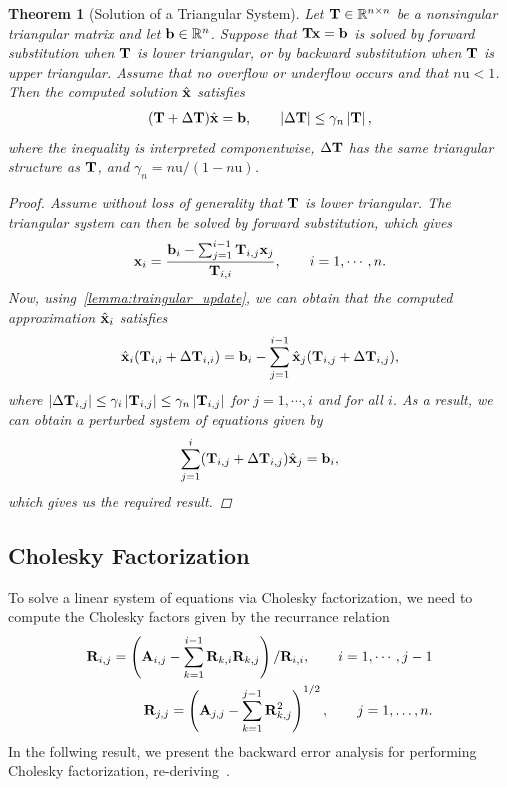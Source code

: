 \documentclass[11pt,draft]{article}
\newcommand{\urd}{\ensuremath{\mathrm{u}}}
\newcommand{\vect}[1]{\mathbf{\MakeLowercase{#1}}}
\newcommand{\mat}[1]{\mathbf{\MakeUppercase{#1}}}
\newcommand{\ireal}[1]{\in\mathbb{R}^{#1}}
\newtheorem{theorem}{Theorem}[section]
\theoremstyle{definition}
\theoremstyle{remark}
\newcommand{\abs}[1]{\left|#1\right|}
\begin{document}
\begin{theorem}[Solution of a Triangular System]\label{theorem:solution_of_a_traingular_system}
Let $\mat{t}\ireal{n\times n}$ be a nonsingular triangular matrix and let
$\vect{b}\ireal{n}$. Suppose that $\mat{t}\vect{x}=\vect{b}$ is solved by
forward substitution when $\mat{t}$ is lower triangular, or by backward
substitution when $\mat{t}$ is upper triangular. Assume that no overflow
or underflow occurs and that $n\urd<1$. Then the computed solution
$\hat{\vect{x}}$ satisfies
\begin{align}
    (\mat{t}+\Delta\mat{t})\hat{\vect{x}}=\vect{b},
    \qquad
    \abs{\Delta\mat{t}}\leq\gamma_n\abs{\mat{t}},
\end{align}
where the inequality is interpreted componentwise,
$\Delta\mat{t}$ has the same triangular structure as $\mat{t}$, and
$\gamma_n=n\urd/(1-n\urd)$.
\begin{proof}
    Assume without loss of generality that $\mat{t}$ is lower triangular.
    The triangular system can then be solved by forward substitution, which gives
    \begin{align}
        \vect{x}_i = \frac{\vect{b}_i - \sum_{j=1}^{i-1}\mat{t}_{i,j}\vect{x}_j}{\mat{t}_{i,i}}, \qquad i=1,\cdots, n.
    \end{align}
    Now, using~\cref{lemma:traingular_update}, we can obtain that the computed approximation $\hat{\vect{x}}_i$ satisfies
    \begin{align}
        \hat{\vect{x}}_i(\mat{t}_{i,i} + \Delta \mat{t}_{i,i}) = \vect{b}_i - \sum_{j=1}^{i-1}\hat{\vect{x}}_j (\mat{t}_{i,j} + \Delta \mat{t}_{i,j}),
    \end{align}
    where $\abs{\Delta \mat{t}_{i,j}} \leq \gamma_{i} \abs{\mat{t}_{i,j}} \leq \gamma_n \abs{\mat{t}_{i,j}}$ for $j=1,\cdots,i$ and for all $i$.
    As a result, we can obtain a perturbed system of equations given by 
    \begin{align}
        \sum_{j=1}^{i}(\mat{t}_{i,j} + \Delta \mat{t}_{i,j})\hat{\vect{x}}_j = \vect{b}_i,
    \end{align}
    which gives us the required result.
\end{proof}
    
\end{theorem}

\subsection{Cholesky Factorization}\label{sec:cholesky_factorization}
To solve a linear system of equations via Cholesky factorization, we need to compute the Cholesky factors given by the recurrance relation
\begin{align}
    \mat{r}_{i,j} = \left(\mat{a}_{i,j} - \sum_{k=1}^{i-1} \mat{r}_{k,i}\mat{r}_{k,j}\right) / \mat{r}_{i,i}, \qquad i = 1,\cdots, j - 1 \\
   \mat{r}_{j,j} =  \left(\mat{a}_{j,j} - \sum_{k=1}^{j-1} \mat{r}_{k,j}^2 \right)^{1/2}, \qquad j = 1,\dots,n. 
\end{align}
In the follwing result, we present the backward error analysis for performing Cholesky factorization, re-deriving~\cite[Theorem 10.4]{higham2002accuracy}.
\end{document}
